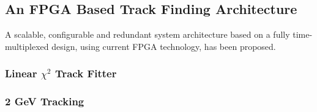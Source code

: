 \subsection{An FPGA Based Track Finding Architecture}

A scalable, configurable and redundant system architecture based on a fully time-multiplexed design, using current FPGA technology, has been proposed.

\subsubsection{Linear $\chi^{2}$ Track Fitter}

\subsubsection{2 GeV Tracking}
